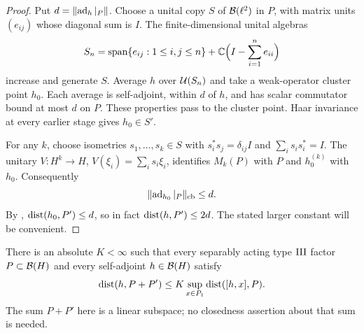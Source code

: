 \begin{proof}
Put $d=\lVert\operatorname{ad}_h|_P\rVert$. Choose a unital copy $S$ of
$\mathcal B(\ell^2)$ in $P$, with matrix units $(e_{ij})$ whose diagonal
sum is $I$. The finite-dimensional unital algebras
\[
 S_n=\operatorname{span}\{e_{ij}:1\le i,j\le n\}
       +\mathbb C\Bigl(I-\sum_{i=1}^ne_{ii}\Bigr)
\]
increase and generate $S$. Average $h$ over $\mathcal U(S_n)$ and take a
weak-operator cluster point $h_0$. Each average is self-adjoint,
within $d$ of $h$, and has scalar commutator bound at most $d$ on
$P$. These properties pass to the cluster point. Haar invariance
at every earlier stage gives $h_0\in S'$.

For any $k$, choose isometries $s_1,\ldots,s_k\in S$ with
$s_i^*s_j=\delta_{ij}I$ and $\sum_i s_is_i^*=I$.
The unitary $V:H^k\to H$, $V(\xi_i)=\sum_i s_i\xi_i$, identifies
$M_k(P)$ with $P$ and $h_0^{(k)}$ with $h_0$. Consequently
\[
 \lVert\operatorname{ad}_{h_0}|_P\rVert_{\mathrm{cb}}\le d.
\]
By , $\operatorname{dist}(h_0,P')\le d$, so in fact
$\operatorname{dist}(h,P')\le2d$. The stated larger constant will be convenient.
\end{proof}

\begin{lemma}
\label{lem:local-normalizer-linear}
There is an absolute $K<\infty$ such that every separably acting
type $\mathrm{III}$ factor $P\subset\mathcal B(H)$ and every self-adjoint
$h\in\mathcal B(H)$ satisfy
\begin{equation}
 \operatorname{dist}(h,P+P')
 \le K\sup_{x\in P_1}\operatorname{dist}([h,x],P).
 \label{eq:normalizer-linear-bound}
\end{equation}
The sum $P+P'$ here is a linear subspace; no closedness assertion
about that sum is needed.
\end{lemma}

